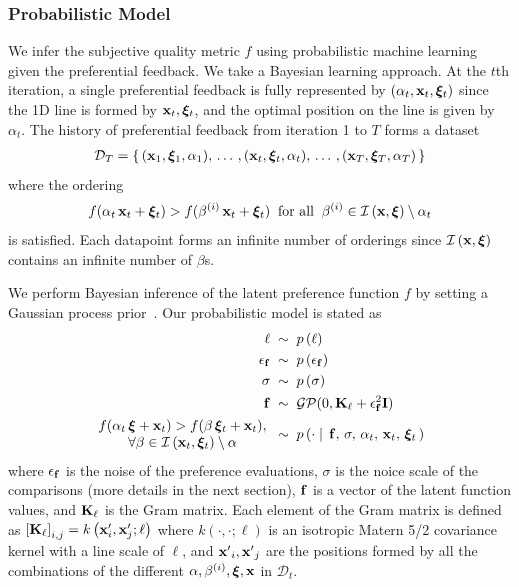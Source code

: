 \subsubsection{Probabilistic Model}
We infer the subjective quality metric \(f\) using probabilistic machine learning given the preferential feedback.
We take a Bayesian learning approach.
At the \(t\)th iteration, a single preferential feedback is fully represented by \((\alpha_t, \mathbf{x}_t, \bm{\xi}_t)\) since the 1D line is formed by \(\mathbf{x}_t, \bm{\xi}_t\), and the optimal position on the line is given by \(\alpha_t\).
The history of preferential feedback from iteration 1 to \(T\) forms a dataset
%
\begin{align*}
  \mathcal{D}_T = \{\,(\mathbf{x}_1, \bm{\xi}_1, \alpha_1),\, \ldots\,, (\mathbf{x}_t, \bm{\xi}_t, \alpha_t),\,\ldots\,, (\mathbf{x}_T, \bm{\xi}_T, \alpha_T) \,\}
\end{align*}
%
where the ordering
\begin{align*}
f(\alpha_t\,\mathbf{x}_t + \bm{\xi}_t ) > f(\beta^{(i)}\,\mathbf{x}_t + \bm{\xi}_t) \;\;\text{for all}\;\; \beta^{(i)} \in \mathcal{I}\left(\mathbf{x}, \bm{\xi}\right) \setminus \alpha_t
\end{align*}
is satisfied.
Each datapoint forms an infinite number of orderings since \(\mathcal{I}\left(\mathbf{x}, \bm{\xi}\right)\) contains an infinite number of \(\beta\)s.

We perform Bayesian inference of the latent preference function \(f\) by setting a Gaussian process prior~\cite{rasmussen_gaussian_2006}.
Our probabilistic model is stated as 
%
{
\begin{align*}
\ell          \;&\sim \; p\,(\ell) \\
\epsilon_{\mathbf{f}} \;&\sim \; p\,(\epsilon_{\mathbf{f}}) \\
\sigma        \;&\sim \; p\,(\sigma) \\
\mathbf{f}           \;&\sim \; \mathcal{GP}(0, \mathbf{K}_{\ell} + \epsilon_{\mathbf{f}}^2\mathbf{I}) \\
\begin{matrix}
\; f(\alpha_t\,\bm{\xi} + \mathbf{x}_t) > f(\beta\,\bm{\xi}_t + \mathbf{x}_t), \; \\
\; \forall\beta \in \mathcal{I}\left(\mathbf{x}_t, \bm{\xi}_t\right) \setminus \alpha \;
\end{matrix}\; &\sim \; p\left(\cdot \mid\, \mathbf{f},\, \sigma,\, \alpha_t,\, \mathbf{x}_t,\, \bm{\xi}_t\,\right) 
\end{align*}
}
{\noindent}where \(\epsilon_{\mathbf{f}}\) is the noise of the preference evaluations, \(\sigma\) is the noice scale of the comparisons (more details in the next section), \(\mathbf{f}\) is a vector of the latent function values, and \(\mathcal{\mathbf{K}}_{\ell}\) is the Gram matrix.
Each element of the Gram matrix is defined as
\(
  {[\mathbf{K}_{\ell}]}_{i,j} = k\left(\mathbf{x}^\prime_i, \mathbf{x}^\prime_j; \ell \right)
\)
where \(k\left(\cdot, \cdot; \ell \right)\) is an isotropic Matern 5/2 covariance kernel with a line scale of \(\ell\), and \({\mathbf{x}^\prime}_i, {\mathbf{x}^\prime}_j\) are the positions formed by all the combinations of the different \(\alpha, \beta^{(i)}, \bm{\xi}, \mathbf{x}\) in \(\mathcal{D}_t\).

